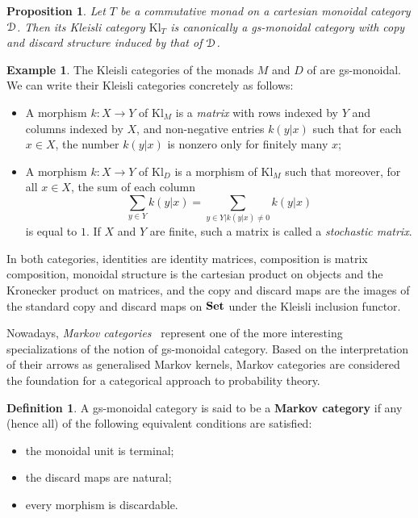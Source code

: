 \documentclass[a4paper,UKenglish,numberwithinsect,cleveref, autoref, thm-restate]{lipics-v2021}
\theoremstyle{plain} %
\newtheorem{myproposition}[mytheorem]{Proposition}
\theoremstyle{definition} %
\newtheorem{mydefinition}[mytheorem]{Definition}
\newtheorem{myexample}[mytheorem]{Example}
\begin{document}
\begin{myproposition}\label{monoidalgs}
 Let $T$ be a commutative monad on a cartesian monoidal category $\mathcal{D}$. 
 Then its Kleisli category $\mathrm{Kl}_T$ is canonically a gs-monoidal category with copy and discard structure induced by that of $\mathcal{D}$.
\end{myproposition}

\begin{myexample}\label{kleisliM}
 The Kleisli categories of the monads $M$ and $D$ of  are gs-monoidal. We can write their Kleisli categories concretely as follows:
 \begin{itemize}
  \item A morphism $k:X\to Y$ of $\mathrm{Kl}_M$ is a \emph{matrix} with rows indexed by $Y$ and columns indexed by $X$, and non-negative entries $k(y|x)$ such that for each $x\in X$, the number $k(y|x)$ is nonzero only for finitely many $x$;
  \item A morphism $k:X\to Y$ of $\mathrm{Kl}_D$ is a morphism of $\mathrm{Kl}_M$ such that moreover, for all $x\in X$, the sum of each column
  \[
   \sum_{y\in Y} k(y|x) = \sum_{y\in Y|k(y|x)\ne 0} k(y|x)
  \]
  is equal to $1$. If $X$ and $Y$ are finite, such a matrix is called a \emph{stochastic matrix}.
 \end{itemize}
 In both categories, identities are identity matrices, composition is matrix composition, monoidal structure is the cartesian product on objects and the Kronecker product on matrices, and the copy and discard maps are the images of the standard copy and discard maps on $\mathbf{Set}$ under the Kleisli inclusion functor.
\end{myexample}

Nowadays, \emph{Markov categories}~\cite{Fritz_2020} represent one of the more interesting specializations of the notion of gs-monoidal category. Based on the interpretation of their arrows
 as generalised Markov kernels, Markov categories are considered the foundation for a categorical approach to probability theory.

\begin{mydefinition}
 A gs-monoidal category is said to be a \textbf{Markov category} if any (hence all) of the following equivalent conditions are satisfied:
 \begin{itemize}
  \item the monoidal unit is terminal;
  \item the discard maps are natural;
  \item every morphism is discardable.
 \end{itemize}
\end{mydefinition}
\end{document}

